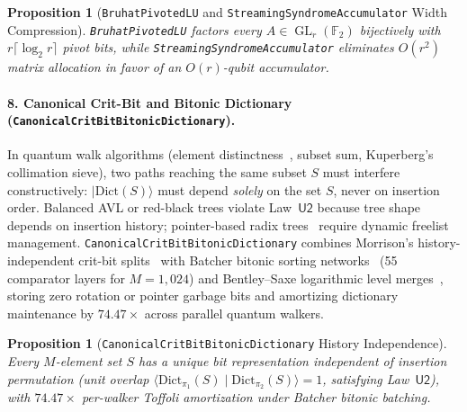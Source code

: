 \documentclass[acmsmall,screen,anonymous]{acmart}
\DeclareRobustCommand{\_}{\ifmmode\text{\char95}\else\char95\penalty0\relax\fi}
\theoremstyle{plain}
\newtheorem{proposition}[theorem]{Proposition}
\begin{document}
\begin{proposition}[\texttt{BruhatPivotedLU} and \texttt{StreamingSyndrome\allowbreak Accumulator} Width Compression]
\label{prop:p3_7}
\texttt{BruhatPivotedLU} factors every $A \in \operatorname{GL}_r(\mathbb{F}_2)$ bijectively with $r\lceil\log_2 r\rceil$ pivot bits, while \texttt{StreamingSyndrome\allowbreak Accumulator} eliminates $O(r^2)$ matrix allocation in favor of an $O(r)$-qubit accumulator.
\end{proposition}

\paragraph{8. Canonical Crit-Bit and Bitonic Dictionary (\texttt{CanonicalCritBitBitonicDictionary}).}
In quantum walk algorithms (element distinctness~\cite{ambainis2007}, subset sum, Kuperberg's collimation sieve), two paths reaching the same subset $S$ must interfere constructively: $|\mathrm{Dict}(S)\rangle$ must depend \emph{solely} on the set $S$, never on insertion order. Balanced AVL or red-black trees violate Law~$\mathsf{U2}$ because tree shape depends on insertion history; pointer-based radix trees~\cite{yuan2022tower} require dynamic freelist management. \texttt{CanonicalCritBitBitonicDictionary} combines Morrison's history-independent crit-bit splits~\cite{morrison1968} with Batcher bitonic sorting networks~\cite{bernstein2009} (55 comparator layers for $M=1{,}024$) and Bentley--Saxe logarithmic level merges~\cite{bentley1980}, storing zero rotation or pointer garbage bits and amortizing dictionary maintenance by $74.47\times$ across parallel quantum walkers.

\begin{proposition}[\texttt{CanonicalCritBitBitonicDictionary} History Independence]
\label{prop:p3_8}
Every $M$-element set $S$ has a unique bit representation independent of insertion permutation (unit overlap $\langle \mathrm{Dict}_{\pi_1}(S) \mid \mathrm{Dict}_{\pi_2}(S) \rangle = 1$, satisfying Law~$\mathsf{U2}$), with $74.47\times$ per-walker Toffoli amortization under Batcher bitonic batching.
\end{proposition}
\end{document}
